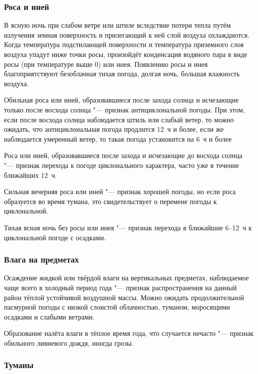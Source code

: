 \subsubsection{Роса и иней}

В ясную ночь при слабом ветре или штиле вследствие потери тепла путём
излучения земная поверхность и прилегающий к ней слой воздуха
охлаждаются. Когда температура подстилающей поверхности и температура
приземного слоя воздуха упадут ниже точки росы, произойдёт конденсация
водяного пара в виде росы (при температуре выше 0\grC) или инея. Появлению
росы и инея благоприятствуют безоблачная тихая погода, долгая ночь,
большая влажность воздуха.

 Обильная роса или иней, образовавшиеся после захода солнца и
исчезающие только после восхода солнца "--- признак антициклональной
погоды. При этом, если после восхода солнца наблюдается штиль или
слабый ветер, то можно ожидать, что антициклональная погода продлится
12~ч и более, если же наблюдается умеренный ветер, то такая погода
установится на 6~ч и более

 Роса или иней, образовавшиеся после захода и исчезающие до
восхода солнца "--- признак перехода к погоде циклонального характера,
часто уже в течение ближайших 12~ч.

 Сильная вечерняя роса или иней "--- признак хорошей погоды, но
если роса образуется во время тумана, это свидетельствует о перемене
погоды к циклональной.

 Тихая ясная ночь без росы или инея "--- признак перехода в ближайшие
6--12~ч к циклональной погоде с осадками.

\subsubsection{Влага на предметах}

 Осаждение жидкой или твёрдой влаги на вертикальных предметах,
наблюдаемое чаще всего в холодный период года "--- признак
распространения на данный район тёплой устойчивой воздушной массы.
Можно ожидать продолжительной пасмурной погоды с низкой слоистой
облачностью, туманом, моросящими осадками и слабыми ветрами.

 Образование налёта влаги в тёплое время года, что случается
нечасто "--- признак обильного ливневого дождя, иногда грозы.

\subsubsection{Туманы}

